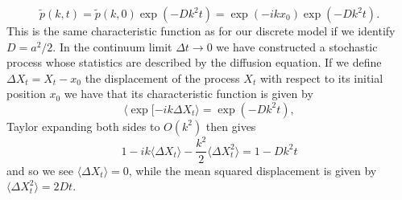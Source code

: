 \documentclass[11pt]{report}
\begin{document}
\begin{equation}
\tilde p(k,t) = \tilde p(k,0)\exp(-Dk^2 t) = \exp(-ikx_0)\exp(-Dk^2 t).
\end{equation}
This is the same characteristic function as for our discrete model if we identify $D = a^2/2$.
In the continuum limit $\Delta t \to 0$ we have constructed a stochastic process whose statistics are described by the diffusion equation. If we define $\Delta X_t = X_t - x_0$ the displacement of the process $X_t$ with respect to its initial position $x_0$ we have that its characteristic function is given by
\begin{equation}
\langle\exp[-i k \Delta X_t\rangle = \exp(-Dk^2t),
\end{equation}
Taylor expanding both sides to $O(k^2)$ then gives
\begin{equation}
1 -ik \langle\Delta X_t\rangle -\frac{k^2}{2}\langle\Delta X^2_t\rangle = 1- Dk^2 t
\end{equation}
and so we see $\langle\Delta X_t\rangle = 0$, while the mean squared displacement is given by $\langle\Delta X_t^2\rangle = 2D t$.
\end{document}
